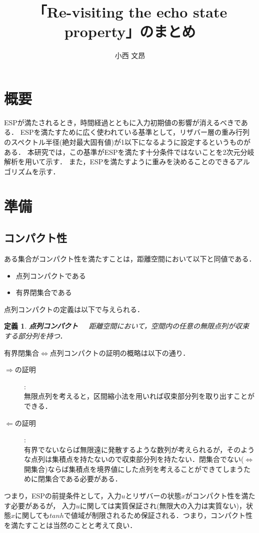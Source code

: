 \documentclass[10pt]{jsarticle}
\title{「Re-visiting the echo state property」のまとめ}
\author{小西 文昂}
\newtheorem{defi}{定義}[section]
\begin{document}
\maketitle

\section{概要}
ESPが満たされるとき，時間経過とともに入力初期値の影響が消えるべきである．
ESPを満たすために広く使われている基準として，リザバー層の重み行列のスペクトル半径(絶対最大固有値)が1以下になるように設定するというものがある．
本研究では，この基準がESPを満たす十分条件ではないことを2次元分岐解析を用いて示す．
また，ESPを満たすように重みを決めることのできるアルゴリズムを示す．

\section{準備}
\subsection{コンパクト性}
ある集合がコンパクト性を満たすことは，距離空間において以下と同値である．
\begin{itemize}
	\item 点列コンパクトである
	\item 有界閉集合である
\end{itemize}

点列コンパクトの定義は以下で与えられる．
\begin{defi}
	\textbf{点列コンパクト}~~~距離空間において，空間内の任意の無限点列が収束する部分列を持つ．
\end{defi}

有界閉集合$\Leftrightarrow$点列コンパクトの証明の概略は以下の通り．
\begin{description}
	\item[$\Rightarrow$の証明]:\\
		無限点列を考えると，区間縮小法を用いれば収束部分列を取り出すことができる．
	\item[$\Leftarrow$の証明]:\\
		有界でないならば無限遠に発散するような数列が考えられるが，そのような点列は集積点を持たないので収束部分列を持たない．閉集合でない($\Leftrightarrow$開集合)ならば集積点を境界値にした点列を考えることができてしまうために閉集合である必要がある．
\end{description}
つまり，ESPの前提条件として，入力$u$とリザバーの状態$x$がコンパクト性を満たす必要があるが，
入力$u$に関しては実質保証され(無限大の入力は実質ない)，状態$x$に関しても$tanh$で値域が制限されるため保証される．つまり，コンパクト性を満たすことは当然のことと考えて良い．
\end{document}
